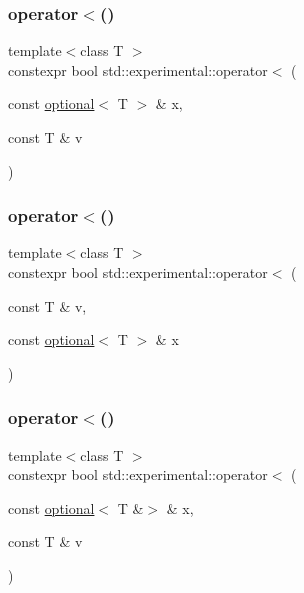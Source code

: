 \mbox{\label{namespacestd_1_1experimental_acd496ce7fb815b5ed07c64c3c50473a5}} 
\subsubsection{\texorpdfstring{operator$<$()}{operator<()}\hspace{0.1cm}{\footnotesize\ttfamily [4/9]}}
{\footnotesize\ttfamily template$<$class T $>$ \\
constexpr bool std\+::experimental\+::operator$<$ (\begin{DoxyParamCaption}\item[{const \hyperlink{classstd_1_1experimental_1_1optional}{optional}$<$ T $>$ \&}]{x,  }\item[{const T \&}]{v }\end{DoxyParamCaption})}

\mbox{\label{namespacestd_1_1experimental_a1d3cd046025f9693e0c6c7e57c67e379}} 
\subsubsection{\texorpdfstring{operator$<$()}{operator<()}\hspace{0.1cm}{\footnotesize\ttfamily [5/9]}}
{\footnotesize\ttfamily template$<$class T $>$ \\
constexpr bool std\+::experimental\+::operator$<$ (\begin{DoxyParamCaption}\item[{const T \&}]{v,  }\item[{const \hyperlink{classstd_1_1experimental_1_1optional}{optional}$<$ T $>$ \&}]{x }\end{DoxyParamCaption})}

\mbox{\label{namespacestd_1_1experimental_a83a84dd901351c69fb0e53efe17526eb}} 
\subsubsection{\texorpdfstring{operator$<$()}{operator<()}\hspace{0.1cm}{\footnotesize\ttfamily [6/9]}}
{\footnotesize\ttfamily template$<$class T $>$ \\
constexpr bool std\+::experimental\+::operator$<$ (\begin{DoxyParamCaption}\item[{const \hyperlink{classstd_1_1experimental_1_1optional}{optional}$<$ T \&$>$ \&}]{x,  }\item[{const T \&}]{v }\end{DoxyParamCaption})}

